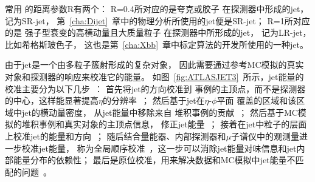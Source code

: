 常用%
的距离参数R有两个：
R=0.4所对应的是夸克或胶子
在探测器中形成的jet，
记为SR-jet，
第~\ref{cha:Dijet}~章中的物理分析所使用的jet便是SR-jet；
R=1所对应的是
强子型衰变的高横动量且大质量粒子
在探测器中所形成的jet，
记为LR-jet，比如希格斯玻色子，
这也是第~\ref{cha:Xbb}~章中标定算法的开发所使用的一种jet。




由于jet是一个由多粒子簇射形成的复杂对象，
因此需要通过参考MC模拟的真实对象和探测器的响应来校准它的能量。
如图~\ref{fig:ATLASJET3}~所示，jet能量的校准主要分为以下几步~\cite{JES1}：
首先将jet的方向校准到
事例的主顶点，而不是探测器的中心，这样能显著提高$\eta$的分辨率~\cite{JES2}；
然后基于jet在$\eta$-$\phi$平面
覆盖的区域和该区域中jet的横动量密度，
从jet能量中移除来自
堆积事例的贡献~\cite{JES3}；
然后基于MC模拟的堆积事例和真实对象的主顶点信息，
修正jet能量~\cite{JES4}；
接着在jet中粒子的层面上校准jet的能量和方向~\cite{JES2}；
随后结合量能器、内部探测器和$\mu$子谱仪中的观测量进一步校准jet能量，
称为全局顺序校准~\cite{JES5}，这一步可以消除jet能量对味信息和jet内部能量分布的依赖性；
最后是原位校准，用来解决数据和MC模拟中jet能量不匹配的问题~\cite{JES1}。

